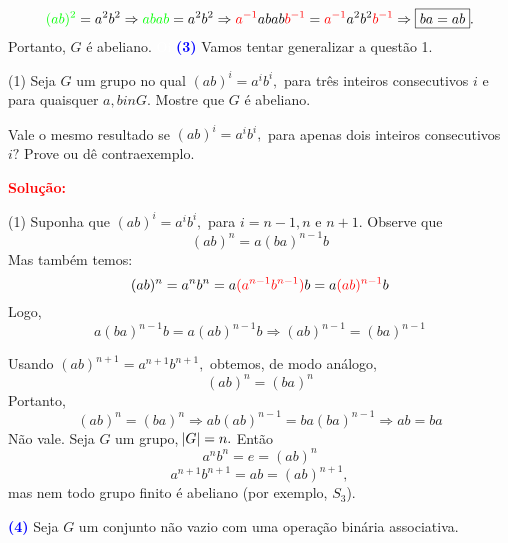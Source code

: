 \documentclass[12pt, a4paper]{article}
\newcommand{\negrito}[1]{\mbox{\boldmath{$#1$}}}
\begin{document}
\[
\textcolor{green}{(ab)^2} = a^2b^2 \Rightarrow \textcolor{green}{abab} = a^2b^2 \Rightarrow \textcolor{red}{a^{-1}} abab  \textcolor{red}{b^{-1}}= \textcolor{red}{a^{-1}}a^2b^2 \textcolor{red}{b^{-1}} \Rightarrow \boxed{ba = ab}.
\]
Portanto, $G$ é abeliano.
\textcolor{white}{Oi}\newline\newline
\textcolor{blue}{\bf(3)}\label{3} Vamos tentar generalizar a questão 1.
\begin{tasks}[counter-format={(tsk[a])},label-width=3.6ex, label-format = {\bfseries}, column-sep = {0pt}](1)
\task[\textcolor{Floresta}{$\negrito{(a)} $}] Seja $G$ um grupo no qual $(ab)^i = a^ib^i,$ para três inteiros consecutivos $i$ e para quaisquer $a,b in G.$ Mostre que $G$ é abeliano.

\task[\textcolor{Floresta}{$\negrito{(b)} $}] Vale o mesmo resultado se $(ab)^i = a^ib^i,$ para apenas dois inteiros consecutivos $i?$ Prove ou dê contraexemplo.
\end{tasks}
\textbf{\textcolor{red}{Solução:}}
\begin{tasks}[counter-format={(tsk[a])},label-width=3.6ex, label-format = {\bfseries}, column-sep = {0pt}](1)
\task[\textcolor{Floresta}{$\negrito{(a)} $}] Suponha que $(ab)^i = a^ib^i,$ para $i = n-1,n$ e $n+1.$ Observe que
\[
(ab)^n = a(ba)^{n-1}b
\]
Mas também temos:
\[
(ab)^n = a^nb^n = a\textcolor{red}{(a^{n-1}b^{n-1})}b = a\textcolor{red}{(ab)^{n-1}}b 
\]
Logo, \[a(ba)^{n-1}b = a(ab)^{n-1}b \Rightarrow (ab)^{n-1} = (ba)^{n-1}\]

Usando $(ab)^{n+1} = a^{n+1}b^{n+1},$ obtemos, de modo análogo, \[(ab)^n = (ba)^n \]
Portanto,
\[
(ab)^n = (ba)^n \Rightarrow ab(ab)^{n-1} = ba(ba)^{n-1} \Rightarrow \boxed{ab = ba}
\]
\task[\textcolor{Floresta}{$\negrito{(b)} $}] Não vale. Seja $G$ um grupo, $\abs{G} = n.$ Então \[ a^nb^n = e = (ab)^n \]
\[a^{n+1}b^{n+1} = ab = (ab)^{n+1},
\]
mas nem todo grupo finito é abeliano (por exemplo, $S_3$).
\end{tasks}
\textcolor{blue}{\bf(4)}\label{4} Seja $G$ um conjunto não vazio com uma operação binária associativa. 
\end{document}
